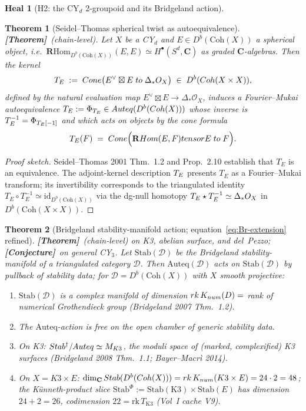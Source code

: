 \documentclass[11pt]{amsart}
\newtheorem{theorem}{Theorem}
\theoremstyle{definition}
\newtheorem{heal}[attack]{Heal}
\providecommand{\Coh}{\mathrm{Coh}}
\providecommand{\Auteq}{\mathrm{Auteq}}
\providecommand{\Stab}{\mathrm{Stab}}
\providecommand{\cM}{\mathcal{M}}
\providecommand{\cO}{\mathcal{O}}
\providecommand{\cK}{\mathcal{K}}
\providecommand{\cF}{\mathcal{F}}
\providecommand{\cD}{\mathcal{D}}
\providecommand{\bC}{\mathbf{C}}
\providecommand{\bR}{\mathbf{R}}
\providecommand{\ClaimStatusTheorem}{\textbf{[Theorem]}}
\providecommand{\ClaimStatusConjectured}{\textbf{[Conjecture]}}
\begin{document}
\begin{heal}[H2: the CY$_d$ 2-groupoid and its Bridgeland action]
\leavevmode

\begin{theorem}[Seidel--Thomas spherical twist as autoequivalence]
\label{thm:ST-twist}
\ClaimStatusTheorem\ (chain-level). Let $X$ be a CY$_d$ and
$E \in D^b(\Coh(X))$ a spherical object, i.e.\
$\bR\mathrm{Hom}_{D^b(\Coh(X))}(E, E) \simeq H^\bullet(S^d, \bC)$
as graded $\bC$-algebras. Then the kernel
\[
 \cT_E \;:=\; \mathrm{Cone}\bigl(E^\vee \boxtimes E \;\to\;
 \Delta_* \cO_X\bigr) \;\in\; D^b(\Coh(X \times X)),
\]
defined by the natural evaluation map
$E^\vee \boxtimes E \to \Delta_* \cO_X$, induces a Fourier--Mukai
autoequivalence $T_E := \Phi_{\cT_E} \in \Auteq(D^b(\Coh(X)))$
whose inverse is $T_E^{-1} = \Phi_{T_E[-1]}$ and which acts on
objects by the cone formula
\[
 T_E(\cF) \;=\; \mathrm{Cone}\Bigl(\bR\mathrm{Hom}(E, \cF) \otimes E
 \;\to\; \cF\Bigr).
\]
\end{theorem}

\begin{proof}[Proof sketch]
Seidel--Thomas 2001 Thm.~1.2 and Prop.~2.10 establish that $T_E$ is
an equivalence. The adjoint-kernel description $T_E$ presents $T_E$
as a Fourier--Mukai transform; its invertibility corresponds to the
triangulated identity
$T_E \circ T_E^{-1} \simeq \mathrm{id}_{D^b(\Coh(X))}$ via the
dg-null homotopy $\cT_E \star \cT_E^{-1} \simeq \Delta_* \cO_X$ in
$D^b(\Coh(X \times X))$.
\end{proof}

\begin{theorem}[Bridgeland stability-manifold action;
equation~\eqref{eq:Br-extension} refined]\label{thm:bridgeland-action}
\ClaimStatusTheorem\ (chain-level) on K3, abelian surface, and
del~Pezzo; \ClaimStatusConjectured\ on general CY$_3$. Let
$\Stab(\cD)$ be the Bridgeland stability-manifold of a triangulated
category $\cD$. Then $\Auteq(\cD)$ acts on $\Stab(\cD)$ by
pullback of stability data; for $\cD = D^b(\Coh(X))$ with $X$
smooth projective:
\begin{enumerate}[label=(\alph*)]
\item $\Stab(\cD)$ is a complex manifold of dimension
$\mathrm{rk}\,\cK_{\rm num}(\cD) = $ rank of numerical Grothendieck
group (Bridgeland 2007 Thm.~1.2).
\item The $\Auteq$-action is free on the open chamber of generic
stability data.
\item On K3: $\Stab^\dagger / \Auteq \simeq \cM_{\rm K3}$, the
moduli space of (marked, complexified) K3 surfaces (Bridgeland 2008
Thm.~1.1; Bayer--Macr\`i 2014).
\item On $X = K3 \times E$:
$\dim_\bC \Stab(D^b(\Coh(X))) = \mathrm{rk}\,\cK_{\rm num}(K3 \times E)
= 24 \cdot 2 = 48$; the Künneth-product slice
$\Stab^\Phi := \Stab(\mathrm{K3}) \times \Stab(E)$ has
dimension $24 + 2 = 26$, codimension $22 = \mathrm{rk}\,
T_{\mathrm{K3}}$ (Vol~I cache V9).
\end{enumerate}
\end{theorem}


\end{heal}
\end{document}
